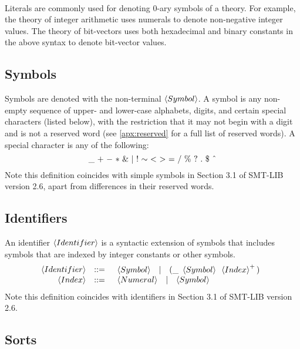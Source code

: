 \documentclass[english,a4paper,10pt]{article}
\newcommand{\mathcircumflex}[0]{\mbox{\^{}}}
\begin{document}
\ 

\noindent
Literals are commonly
used for denoting 0-ary symbols of a theory.
For example, 
the theory of integer arithmetic 
uses numerals to denote non-negative integer values.
The theory of bit-vectors uses both
hexadecimal and binary constants in the above syntax
to denote bit-vector values.

\subsection{Symbols}

Symbols are denoted with the non-terminal $\left\langle Symbol\right\rangle$. 
A symbol
is any non-empty sequence of upper- and lower-case alphabets, digits,
and certain special characters (listed below), with the restriction that it may not
begin with a digit and is not a reserved word (see \cref{apx:reserved} 
for a full list of reserved words).
A special character is any of the following:
\[
{\tt \_}\mbox{ }{\tt +}\mbox{ }{\tt -}\mbox{ }{\tt *}\mbox{ }{\tt \&}\mbox{ }{\tt |}\mbox{ }{\tt !}\mbox{ }{\tt \sim}\mbox{ }{\tt <}\mbox{ }{\tt >}\mbox{ }{\tt =}\mbox{ }{\tt /}\mbox{ }{\tt \%}\mbox{ }{\tt ?}\mbox{ }{\tt .}\mbox{ }{\tt \$}\mbox{ }{\tt \mathcircumflex}
\]
Note this definition coincides with simple
symbols in Section 3.1 of SMT-LIB version 2.6,
apart from differences in their reserved words.

\subsection{Identifiers}

An identifier $\left\langle Identifier\right\rangle$
is a syntactic extension of symbols 
that includes symbols that are indexed by integer constants or other symbols.
\[
\begin{array}{rcl}
\left\langle Identifier\right\rangle & ::= & \begin{array}{ccc}
\left\langle Symbol\right\rangle & | & {\tt (}{\tt \_}\mbox{ }\left\langle Symbol\right\rangle\mbox{ }\left\langle Index\right\rangle^{+}{\tt )}
\end{array}\\
\left\langle Index\right\rangle & ::= & \begin{array}{ccc}
\left\langle Numeral\right\rangle & | & \left\langle Symbol\right\rangle
\end{array}\\
\end{array}
\]
Note this definition coincides with
identifiers in Section 3.1 of SMT-LIB version 2.6.

\subsection{Sorts}
\end{document}
